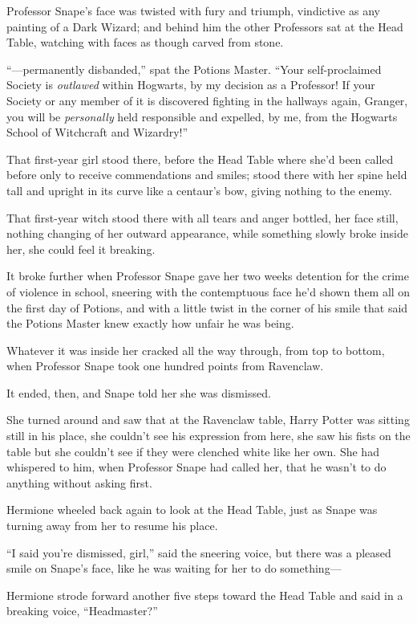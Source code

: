 Professor Snape’s face was twisted with fury and triumph, vindictive as any painting of a Dark Wizard; and behind him the other Professors sat at the Head Table, watching with faces as though carved from stone.

“—permanently disbanded,” spat the Potions Master. “Your self-proclaimed Society is \emph{outlawed} within Hogwarts, by my decision as a Professor! If your Society or any member of it is discovered fighting in the hallways again, Granger, you will be \emph{personally} held responsible and expelled, by me, from the Hogwarts School of Witchcraft and Wizardry!”

That first-year girl stood there, before the Head Table where she’d been called before only to receive commendations and smiles; stood there with her spine held tall and upright in its curve like a centaur’s bow, giving nothing to the enemy.

That first-year witch stood there with all tears and anger bottled, her face still, nothing changing of her outward appearance, while something slowly broke inside her, she could feel it breaking.

It broke further when Professor Snape gave her two weeks detention for the crime of violence in school, sneering with the contemptuous face he’d shown them all on the first day of Potions, and with a little twist in the corner of his smile that said the Potions Master knew exactly how unfair he was being.

Whatever it was inside her cracked all the way through, from top to bottom, when Professor Snape took one hundred points from Ravenclaw.

It ended, then, and Snape told her she was dismissed.

She turned around and saw that at the Ravenclaw table, Harry Potter was sitting still in his place, she couldn’t see his expression from here, she saw his fists on the table but she couldn’t see if they were clenched white like her own. She had whispered to him, when Professor Snape had called her, that he wasn’t to do anything without asking first.

Hermione wheeled back again to look at the Head Table, just as Snape was turning away from her to resume his place.

“I said you’re dismissed, girl,” said the sneering voice, but there was a pleased smile on Snape’s face, like he was waiting for her to do something—

Hermione strode forward another five steps toward the Head Table and said in a breaking voice, “Headmaster?”

